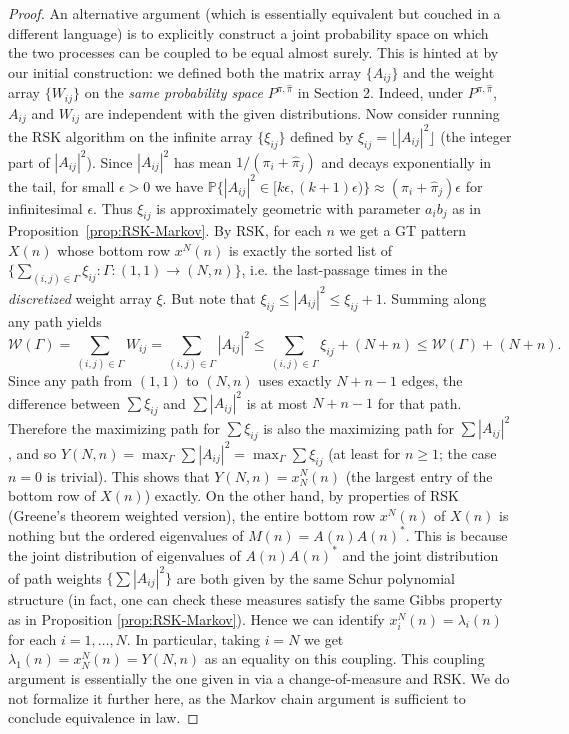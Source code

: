 \documentclass[letterpaper,11pt,oneside,reqno]{article}
\numberwithin{equation}{section}
\theoremstyle{definition}
\begin{document}
\begin{proof}
An alternative argument (which is essentially equivalent but couched in a different language) is to explicitly construct a joint probability space on which the two processes can be coupled to be equal almost surely. This is hinted at by our initial construction: we defined both the matrix array $\{A_{ij}\}$ and the weight array $\{W_{ij}\}$ on the \emph{same probability space} $P^{\pi,\hat\pi}$ in Section 2. Indeed, under $P^{\pi,\hat\pi}$, $A_{ij}$ and $W_{ij}$ are independent with the given distributions. Now consider running the RSK algorithm on the infinite array $\{\xi_{ij}\}$ defined by $\xi_{ij} = \lfloor |A_{ij}|^2\rfloor$ (the integer part of $|A_{ij}|^2$). Since $|A_{ij}|^2$ has mean $1/(\pi_i+\hat\pi_j)$ and decays exponentially in the tail, for small $\epsilon>0$ we have $\mathbb{P}\{|A_{ij}|^2\in [k\epsilon,(k+1)\epsilon)\} \approx (\pi_i+\hat\pi_j)\epsilon$ for infinitesimal $\epsilon$. Thus $\xi_{ij}$ is approximately geometric with parameter $a_i b_j$ as in Proposition~\ref{prop:RSK-Markov}. By RSK, for each $n$ we get a GT pattern $X(n)$ whose bottom row $x^N(n)$ is exactly the sorted list of $\{\sum_{(i,j)\in\Gamma} \xi_{ij}: \Gamma: (1,1)\to(N,n)\}$, i.e. the last-passage times in the \emph{discretized} weight array $\xi$. But note that $\xi_{ij} \le |A_{ij}|^2 \le \xi_{ij}+1$. Summing along any path yields
\[ \mathcal{W}(\Gamma) = \sum_{(i,j)\in\Gamma} W_{ij} = \sum_{(i,j)\in\Gamma} |A_{ij}|^2 \le \sum_{(i,j)\in\Gamma} \xi_{ij} + (N+n) \le \mathcal{W}(\Gamma)+ (N+n). \]
Since any path from $(1,1)$ to $(N,n)$ uses exactly $N+n-1$ edges, the difference between $\sum \xi_{ij}$ and $\sum |A_{ij}|^2$ is at most $N+n-1$ for that path. Therefore the maximizing path for $\sum \xi_{ij}$ is also the maximizing path for $\sum |A_{ij}|^2$, and so $Y(N,n) = \max_{\Gamma} \sum |A_{ij}|^2 = \max_{\Gamma} \sum \xi_{ij}$ (at least for $n\ge1$; the case $n=0$ is trivial). This shows that $Y(N,n) = x^N_N(n)$ (the largest entry of the bottom row of $X(n)$) exactly. On the other hand, by properties of RSK (Greene's theorem weighted version), the entire bottom row $x^N(n)$ of $X(n)$ is nothing but the ordered eigenvalues of $M(n) = A(n)A(n)^*$. This is because the joint distribution of eigenvalues of $A(n)A(n)^*$ and the joint distribution of path weights $\{\sum |A_{ij}|^2\}$ are both given by the same Schur polynomial structure (in fact, one can check these measures satisfy the same Gibbs property as in Proposition \ref{prop:RSK-Markov}). Hence we can identify $x^N_i(n) = \lambda_i(n)$ for each $i=1,\dots,N$. In particular, taking $i=N$ we get $\lambda_1(n) = x^N_N(n) = Y(N,n)$ as an equality on this coupling. This coupling argument is essentially the one given in \cite{DiekerWarren2009} via a change-of-measure and RSK. We do not formalize it further here, as the Markov chain argument is sufficient to conclude equivalence in law.
\end{proof}
\end{document}
